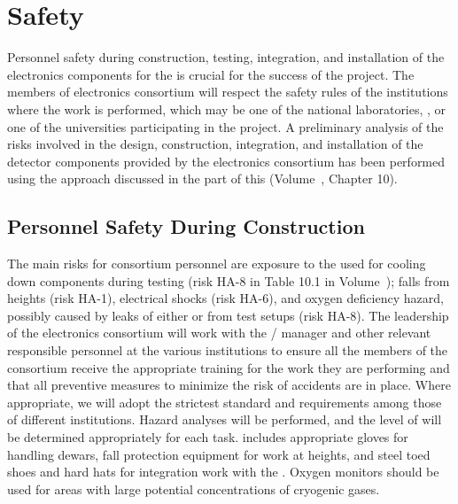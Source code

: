 \section{Safety}
\label{sec:fdsp-tpcelec-safety}

Personnel safety during construction, testing, integration,
and installation of the  electronics components for the 
  is crucial for the success
of the project. The members of  electronics consortium will
respect the safety rules of the institutions where the work is
performed, which may be one of the national laboratories, ,
or one of the universities participating in the project. A
preliminary analysis of the risks involved in the design,
construction, integration, and installation of the detector
components provided by the  electronics consortium has been
performed using the approach discussed in the \voltitletc
part of this  (Volume~\volnumbertc, Chapter 10). 


\subsection{Personnel Safety During Construction}
\label{sec:fdsp-tpcelec-safety-personnel}

The main risks for consortium personnel are exposure to
the \lntwo used for cooling down components during testing (risk HA-8
in Table 10.1 in Volume~\volnumbertc); falls from heights (risk HA-1), 
electrical shocks (risk HA-6), and oxygen deficiency hazard, possibly 
caused by leaks of either \lntwo or  from test setups (risk HA-8).
The leadership of the
 electronics consortium will work with the /
 manager and other relevant responsible personnel at the
various institutions to ensure all the members of the
consortium receive the appropriate training for the work they
are performing and that all preventive measures to minimize
the risk of accidents are in place. Where appropriate,
we will adopt the strictest standard and requirements among
those of different institutions. Hazard analyses will be performed,
and the level of  will be determined
appropriately for each task.  includes 
appropriate gloves for handling \lntwo dewars, fall
protection equipment for work at heights, and steel toed shoes and
hard hats for integration work with the . Oxygen
monitors should be used for areas with large potential concentrations of
cryogenic gases.


